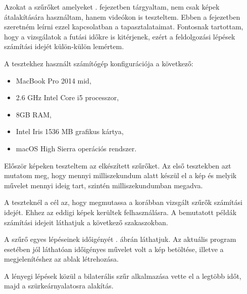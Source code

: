 
\label{chap:tests}

Azokat a szűrőket amelyeket . fejezetben tárgyaltam, nem csak képek átalakítására használtam, hanem videókon is teszteltem. Ebben a fejezetben szeretném leírni ezzel kapcsolatban a tapasztalataimat.  Fontosnak tartottam, hogy a vizsgálatok a futási időkre is kitérjenek, ezért a feldolgozási lépések számítási idejét külön-külön lemértem.

A tesztekhez használt számítógép konfigurációja a következő:
\begin{itemize}
\item MacBook Pro 2014 mid,
\item 2.6 GHz Intel Core i5 processzor,
\item 8GB RAM,
\item Intel Iris 1536 MB grafikus kártya,
\item macOS High Sierra operációs rendszer.
\end{itemize}


Először képeken teszteltem az elkészített szűrőket. Az első tesztekben azt mutatom meg, hogy mennyi milliszekundum alatt készül el a kép és melyik művelet mennyi ideig tart, szintén milliszekundumban megadva.

A teszteknél a cél az, hogy megmutassa a korábban vizsgált szűrők számítási idejét. Ehhez az eddigi képek kerültek felhasználásra. A bemutatott példák számítási idejeit láthatjuk a következő szakaszokban.

\newpage


A szűrő egyes lépéseinek időigényét . ábrán láthatjuk. Az aktuális program esetében jól láthatóan időigényes művelet volt a kép betöltése, illetve a megjelenítéshez az ablak létrehozása.

A lényegi lépések közül a bilaterális szűr alkalmazása vette el a legtöbb időt, majd a szürkeárnyalatosra alakítás.


